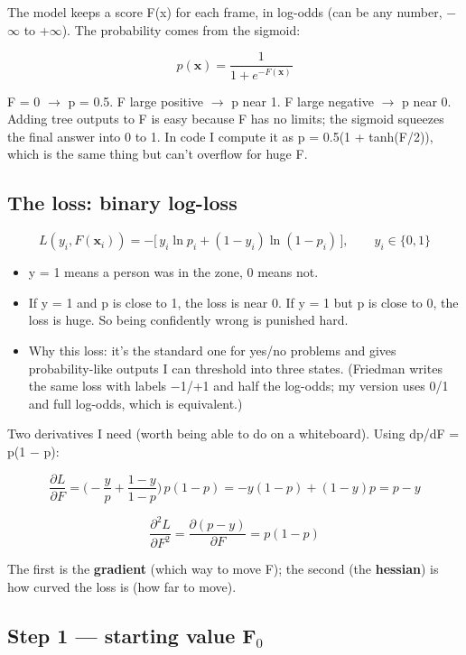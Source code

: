 \documentclass[11pt,a4paper]{article}
\providecommand{\tightlist}{\setlength{\itemsep}{0pt}\setlength{\parskip}{0pt}}
\begin{document}
The model keeps a score F(x)
for each frame, in log-odds
(can be any number, $-$$\infty$ to +$\infty$).
The probability comes from the
sigmoid:

\[
p(\mathbf{x}) = \frac{1}{1+e^{-F(\mathbf{x})}}
\]

F = 0 $\rightarrow$ p = 0.5. F large
positive $\rightarrow$ p near 1. F large
negative $\rightarrow$ p near 0. Adding
tree outputs to F is easy
because F has no limits; the
sigmoid squeezes the final
answer into 0 to 1. In code I
compute it as p = 0.5(1 +
tanh(F/2)), which is the same
thing but can't overflow for
huge \textbar F\textbar.

\hypertarget{the-loss-binary-log-loss}{%
\subsection{The loss: binary
log-loss}\label{the-loss-binary-log-loss}}

\[
L(y_i, F(\mathbf{x}_i)) = -\big[\,y_i\ln p_i + (1-y_i)\ln(1-p_i)\,\big], \qquad y_i \in \{0,1\}
\]

\begin{itemize}
\tightlist
\item
  y = 1 means a person was in
  the zone, 0 means not.
\item
  If y = 1 and p is close to
  1, the loss is near 0. If y
  = 1 but p is close to 0, the
  loss is huge. So being
  confidently wrong is
  punished hard.
\item
  Why this loss: it's the
  standard one for yes/no
  problems and gives
  probability-like outputs I
  can threshold into three
  states. (Friedman writes the
  same loss with labels $-$1/+1
  and half the log-odds; my
  version uses 0/1 and full
  log-odds, which is
  equivalent.)
\end{itemize}

Two derivatives I need (worth
being able to do on a
whiteboard). Using dp/dF = p(1
$-$ p):

\[
\frac{\partial L}{\partial F} = \Big(-\frac{y}{p} + \frac{1-y}{1-p}\Big)\,p(1-p) = -y(1-p) + (1-y)p = p - y
\]

\[
\frac{\partial^2 L}{\partial F^2} = \frac{\partial (p-y)}{\partial F} = p(1-p)
\]

The first is the
\textbf{gradient} (which way
to move F); the second (the
\textbf{hessian}) is how
curved the loss is (how far to
move).

\hypertarget{step-1-starting-value-fux2080}{%
\subsection{Step 1 ---
starting value
F$_0$}\label{step-1-starting-value-fux2080}}
\end{document}
